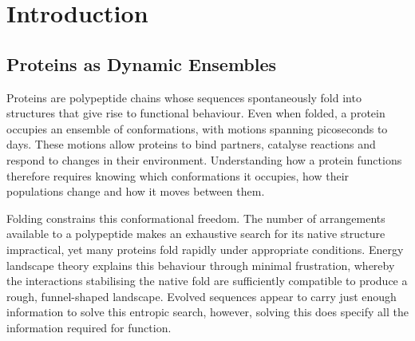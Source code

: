 
\chapter{Introduction}
\label{ch:introduction}

\section{Proteins as Dynamic Ensembles}
\label{sec:intro-ensembles}

Proteins are polypeptide chains whose sequences spontaneously fold into structures that give rise to functional behaviour. Even when folded, a protein occupies an ensemble of conformations, with motions spanning picoseconds to days.\supercite{parraFrustrationPhysiologyMolecular2025,sapienzaUsingNMRStudy2010} These motions allow proteins to bind partners, catalyse reactions and respond to changes in their environment.\supercite{karplusMolecularDynamicsSimulations2002} Understanding how a protein functions therefore requires knowing which conformations it occupies, how their populations change and how it moves between them.

Folding constrains this conformational freedom. The number of arrangements available to a polypeptide makes an exhaustive search for its native structure impractical, yet many proteins fold rapidly under appropriate conditions. Energy landscape theory explains this behaviour through minimal frustration, whereby the interactions stabilising the native fold are sufficiently compatible to produce a rough, funnel-shaped landscape.\supercite{parraFrustrationPhysiologyMolecular2025} Evolved sequences appear to carry just enough information to solve this entropic search, however, solving this does specify all the information required for function.\supercite{galpernInformationtheoreticArgumentRestriction2026}

